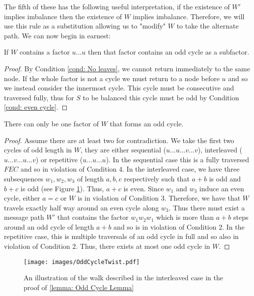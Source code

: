 The fifth of these has the following useful interpretation, if the existence of $W'$ implies imbalance then the existence of $W$ implies imbalance. Therefore, we will use this rule as a substitution allowing us to "modify" $W$ to take the alternate path. We can now begin in earnest:
\begin{lemma}
    If $W$ contains a factor $u...u$ then that factor contains an odd cycle as a subfactor.
\end{lemma}
\begin{proof}
    By Condition \ref{cond: No leaves}, we cannot return immediately to the same node. If the whole factor is not a cycle we must return to a node before $u$ and so we instead consider the innermost cycle. This cycle must be consecutive and traversed fully, thus for $S$ to be balanced this cycle must be odd by Condition \ref{cond: even cycle}.
\end{proof}
\begin{lemma}
\label{lemma: Odd Cycle Lemma}
    There can only be one factor of $W$ that forms an odd cycle.
\end{lemma}
\begin{proof}
    Assume there are at least two for contradiction. We take the first two cycles of odd length in $W$, they are either sequential ($u...u...v...v$), interleaved ($u...v...u...v$) or repetitive ($u...u...u$). In the sequential case this is a fully traversed $FEC$ and so in violation of Condition $4$. In the interleaved case, we have three subsequences $w_1,w_2,w_3$ of length $a,b,c$ respectively such that $a+b$ is odd and $b+c$ is odd (see Figure \ref{fig: Odd Cycle Lemma Diagram}). Thus, $a+c$ is even. Since $w_1$ and $w_3$ induce an even cycle, either $a=c$ or $W$ is in violation of Condition $3$. Therefore, we have that $W$ travels exactly half way around an even cycle along $w_3$. Thus there must exist a message path $W'$ that contains the factor $w_1w_2w_1$ which is more than $a+b$ steps around an odd cycle of length $a+b$ and so is in violation of Condition $2$. In the repetitive case, this is multiple traversals of an odd cycle in full and so also in violation of Condition $2$. Thus, there exists at most one odd cycle in $W$.
\end{proof}
\begin{figure}
    \centering
    \texttt{[image: images/OddCycleTwist.pdf]}
    \caption{An illustration of the walk described in the interleaved case in the proof of \ref{lemma: Odd Cycle Lemma}}
    \label{fig: Odd Cycle Lemma Diagram}
\end{figure}
